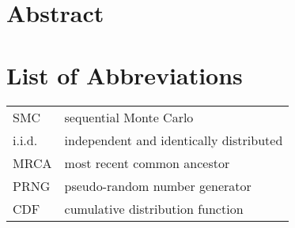 \documentclass[oneside]{scrbook} %
\theoremstyle{definition}
\newcommand{\1}[1]{\mathbbm{1}_{#1}}
\begin{document}
\chapter[Abstract]{Abstract} %



\chapter{List of Abbreviations}
\begin{tabular}{p{} p{}}
SMC & sequential Monte Carlo \\
i.i.d. & independent and identically distributed \\
MRCA & most recent common ancestor \\
PRNG & pseudo-random number generator \\
CDF & cumulative distribution function \\
\end{tabular}
\end{document}
